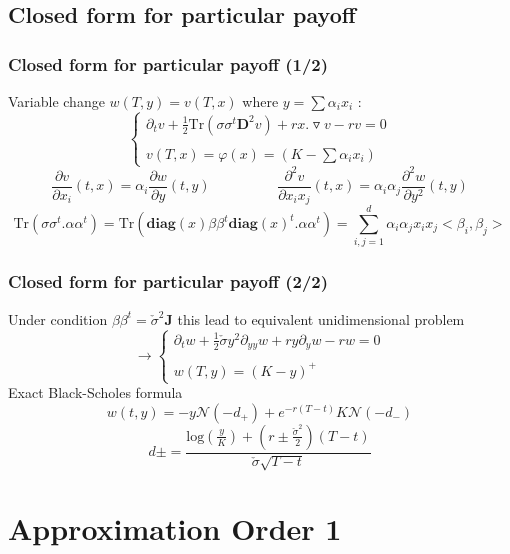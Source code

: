 \documentclass[]{beamer}
\begin{document}
\subsection{Closed form for particular payoff}
\begin{frame}
\frametitle{Closed form for particular payoff (1/2)}
Variable change $w(T,y)=v(T,x)$ where $y=\sum \alpha_i x_i$ :
\[
\left\{
\begin{array}{ll}
\partial_t v +\frac{1}{2} \text{Tr}(\sigma \sigma^{t} \textbf{D}^2 v ) +rx .\triangledown v - r v =0 \\ \\
v(T,x) = \varphi(x) = (K-\sum \alpha_i x_i)
\end{array}
\right.
\]
\[\label{eq:diff_w}
\frac{\partial v}{\partial x_i}(t,x) = \alpha_i \frac{\partial w}{\partial y} (t,y)
\hspace{2cm}
\frac{\partial^2 v}{\partial x_ix_j}(t,x) = \alpha_i\alpha_j \frac{\partial^2 w}{\partial y^2} (t,y)
\]
\[
\text{Tr}(\sigma \sigma^{t}.\alpha\alpha^{t}) 
= \text{Tr}( \textbf{diag}(x) \beta\beta^{t} \textbf{diag}(x)^t.\alpha\alpha^{t})
= \sum_{i,j=1}^d \alpha_i\alpha_j x_i x_j <\beta_i , \beta_j>
\]
\end{frame}
\begin{frame}
\frametitle{Closed form for particular payoff (2/2)}
Under condition $\beta\beta^{t} = \check{\sigma}^2 \textbf{J}$ this lead to equivalent unidimensional problem
\[
\longrightarrow\left\{
\begin{array}{ll}
\partial_t w +\frac{1}{2} \check{\sigma} y^2 \partial_{yy} w  +  r y \partial_{y} w - r w = 0 \\ \\
w(T,y) = (K-y)^+
\end{array}
\right.
\] 
Exact Black-Scholes formula
\[
w(t,y) =- y \mathcal{N}(-d_+) + e^{-r(T-t)} K \mathcal{N}(-d_-)
\]
\[
d\pm = \frac{ \text{log}(\frac{y}{K}) + (r \pm \frac{\check{\sigma}^2}{2} )(T-t) } {   \check{\sigma}  \sqrt{T-t} }
\]

\end{frame}
\section{Approximation Order 1}
\end{document}
